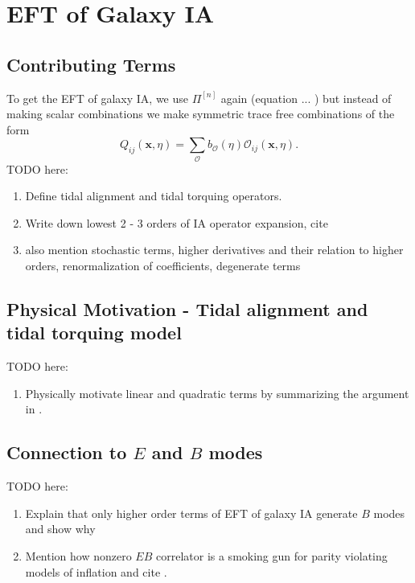 \documentclass[11pt]{article}
\begin{document}
\section{EFT of Galaxy IA}
\subsection{Contributing Terms}
To get the EFT of galaxy IA, we use $\Pi^{[n]}$ again (equation ... %
) but instead of making scalar combinations we make symmetric trace free combinations of the form
\begin{equation}
    Q_{ij}(\mathbf x, \eta) = \sum_{\mathcal O}b_{\mathcal O}(\eta)\mathcal O_{ij}(\mathbf x, \eta).
\end{equation}
TODO here:
\begin{enumerate}
    \item Define tidal alignment and tidal torquing operators.
    \item Write down lowest 2 - 3 orders of IA operator expansion, cite \cite{Vlah_2020}
    \item also mention stochastic terms, higher derivatives and their relation to higher orders, renormalization of coefficients, degenerate terms
\end{enumerate}

\subsection{Physical Motivation - Tidal alignment and tidal torquing model}
TODO here:
\begin{enumerate}
    \item Physically motivate linear and quadratic terms by summarizing the argument in \cite{Chisari_2013}.
\end{enumerate}

\subsection{Connection to $E$ and $B$ modes}
TODO here:
\begin{enumerate}
    \item Explain that only higher order terms of EFT of galaxy IA generate $B$ modes and show why
    \item Mention how nonzero $EB$ correlator is a smoking gun for parity violating models of inflation and cite \cite{Biagetti_2020}.
\end{enumerate}
\end{document}
